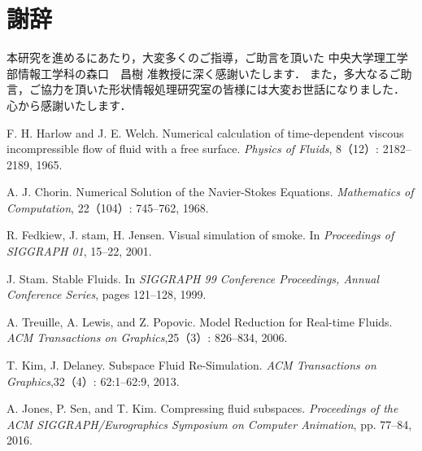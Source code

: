 \documentclass[a4j,12pt]{jreport}
\def\syaji{ \chapter*{謝辞} \addcontentsline{toc}{chapter}{謝辞}}
\begin{document}

\syaji
\par
本研究を進めるにあたり，大変多くのご指導，ご助言を頂いた
中央大学理工学部情報工学科の森口　昌樹 准教授に深く感謝いたします．
また，多大なるご助言，ご協力を頂いた形状情報処理研究室の皆様には大変お世話になりました．
心から感謝いたします．


\begin{thebibliography}{99}
F. H. Harlow and J. E. Welch. Numerical calculation of time-dependent viscous incompressible flow of fluid with a free surface. \textit{Physics of Fluids}, 8（12）: 2182--2189, 1965.

A. J. Chorin. Numerical Solution of the Navier-Stokes Equations. \textit{Mathematics of Computation}, 22（104）: 745--762, 1968.

R. Fedkiew, J. stam, H. Jensen. Visual simulation of smoke. In \textit{Proceedings of SIGGRAPH 01}, 15--22, 2001.

J. Stam. Stable Fluids. In \textit{SIGGRAPH 99 Conference Proceedings, Annual Conference Series}, pages 121--128, 1999.

A. Treuille, A. Lewis, and Z. Popovic. Model Reduction for Real-time Fluids. \textit{ACM Transactions on Graphics},25（3）: 826--834, 2006.

T. Kim, J. Delaney. Subspace Fluid Re-Simulation. \textit{ACM Transactions on Graphics},32（4）: 62:1--62:9, 2013.

A. Jones, P. Sen, and T. Kim. Compressing fluid subspaces. \textit{Proceedings of the ACM SIGGRAPH/Eurographics Symposium on Computer Animation}, pp. 77--84, 2016.


\end{thebibliography}
\end{document}
